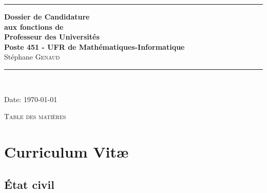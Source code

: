 \documentclass[11pt]{article}
\begin{document}
\thispagestyle{empty}




\rule{\linewidth}{1mm}
\begin{center}
\Large{\textbf{Dossier de Candidature\\
aux fonctions de \\
Professeur des Universités\\
Poste 451 - UFR de Mathématiques-Informatique}}\\[5mm]
\Large{Stéphane \textsc{Genaud}}\\[1cm]

\rule{\linewidth}{1mm}
\\
\vspace{3cm}
\end{center}
\begin{center}
Date: \today\\
\end{center}

\newpage
\mbox{}%

\setlength{\parindent}{5mm} %
\setlength{\parindent}{0mm}
\newpage


\begin{center}
\huge{\textsc{Table des matières}}
\end{center}
\vspace{2cm}


\tableofcontents

\noindent


\newpage



\section{Curriculum Vit{\ae}}

\setlength{\tabcolsep}{5pt}

\subsection{\'Etat civil}

\medskip
\end{document}
